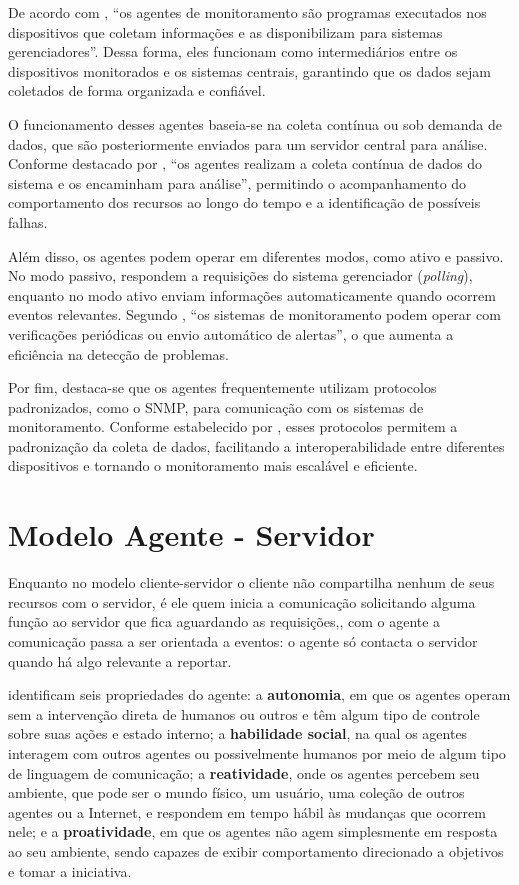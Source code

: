 \documentclass[
    12pt
    ,oneside
    ,a4paper
    ,chapter=TITLE
    ,section=TITLE
    ,sumario=abnt-6027-2012]{abntex2}
\begin{document}
De acordo com , “os agentes de monitoramento são programas executados nos dispositivos que coletam informações e as disponibilizam para sistemas gerenciadores”. Dessa forma, eles funcionam como intermediários entre os dispositivos monitorados e os sistemas centrais, garantindo que os dados sejam coletados de forma organizada e confiável.

O funcionamento desses agentes baseia-se na coleta contínua ou sob demanda de dados, que são posteriormente enviados para um servidor central para análise. Conforme destacado por , “os agentes realizam a coleta contínua de dados do sistema e os encaminham para análise”, permitindo o acompanhamento do comportamento dos recursos ao longo do tempo e a identificação de possíveis falhas.

Além disso, os agentes podem operar em diferentes modos, como ativo e passivo. No modo passivo, respondem a requisições do sistema gerenciador (\textit{polling}), enquanto no modo ativo enviam informações automaticamente quando ocorrem eventos relevantes. Segundo , “os sistemas de monitoramento podem operar com verificações periódicas ou envio automático de alertas”, o que aumenta a eficiência na detecção de problemas.

Por fim, destaca-se que os agentes frequentemente utilizam protocolos padronizados, como o SNMP, para comunicação com os sistemas de monitoramento. Conforme estabelecido por , esses protocolos permitem a padronização da coleta de dados, facilitando a interoperabilidade entre diferentes dispositivos e tornando o monitoramento mais escalável e eficiente.

\section{Modelo Agente - Servidor}


Enquanto no modelo cliente-servidor o cliente não compartilha nenhum de seus recursos com o servidor, é ele quem inicia a comunicação solicitando alguma função ao servidor que fica aguardando as requisições,, com o agente a comunicação passa a ser orientada a eventos: o agente só contacta o servidor quando há algo relevante a reportar.

 identificam seis propriedades do agente: a \textbf{autonomia}, em que os agentes operam sem a intervenção direta de humanos ou outros e têm algum tipo de controle sobre suas ações e estado interno; a \textbf{habilidade social}, na qual os agentes interagem com outros agentes ou possivelmente humanos por meio de algum tipo de linguagem de comunicação; a \textbf{reatividade}, onde os agentes percebem seu ambiente, que pode ser o mundo físico, um usuário, uma coleção de outros agentes ou a Internet, e respondem em tempo hábil às mudanças que ocorrem nele; e a \textbf{proatividade}, em que os agentes não agem simplesmente em resposta ao seu ambiente, sendo capazes de exibir comportamento direcionado a objetivos e tomar a iniciativa.
\end{document}
